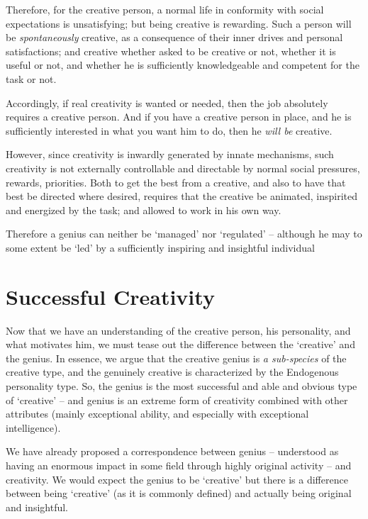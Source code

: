 \documentclass[
]{book}
\begin{document}
Therefore, for the creative person, a normal life in conformity with social expectations is unsatisfying; but being creative is rewarding. Such a person will be \emph{spontaneously} creative, as a consequence of their inner drives and personal satisfactions; and creative whether asked to be creative or not, whether it is useful or not, and whether he is sufficiently knowledgeable and competent for the task or not.

Accordingly, if real creativity is wanted or needed, then the job absolutely requires a creative person. And if you have a creative person in place, and he is sufficiently interested in what you want him to do, then he \emph{will be} creative.

However, since creativity is inwardly generated by innate mechanisms, such creativity is not externally controllable and directable by normal social pressures, rewards, priorities. Both to get the best from a creative, and also to have that best be directed where desired, requires that the creative be animated, inspirited and energized by the task; and allowed to work in his own way.

Therefore a genius can neither be `managed' nor `regulated' -- although he may to some extent be `led' by a sufficiently inspiring and insightful individual

\hypertarget{successful-creativity}{%
\chapter{Successful Creativity}\label{successful-creativity}}

Now that we have an understanding of the creative person, his personality, and what motivates him, we must tease out the difference between the `creative' and the genius. In essence, we argue that the creative genius is \emph{a sub-species} of the creative type, and the genuinely creative is characterized by the Endogenous personality type. So, the genius is the most successful and able and obvious type of `creative' -- and genius is an extreme form of creativity combined with other attributes (mainly exceptional ability, and especially with exceptional intelligence).

We have already proposed a correspondence between genius -- understood as having an enormous impact in some field through highly original activity -- and creativity. We would expect the genius to be `creative' but there is a difference between being `creative' (as it is commonly defined) and actually being original and insightful.
\end{document}
